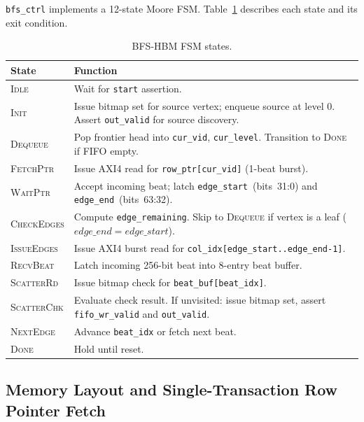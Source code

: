 \texttt{bfs\_ctrl} implements a 12-state Moore FSM. Table~\ref{tab:states} describes
each state and its exit condition.

\begin{table}[h]
\centering
\caption{BFS-HBM FSM states.}
\label{tab:states}
\small
\begin{tabular}{@{}lp{5.2cm}@{}}
\toprule
State & Function \\
\midrule
\textsc{Idle}       & Wait for \texttt{start} assertion. \\
\textsc{Init}       & Issue bitmap set for source vertex; enqueue source at level 0.
                       Assert \texttt{out\_valid} for source discovery. \\
\textsc{Dequeue}    & Pop frontier head into \texttt{cur\_vid}, \texttt{cur\_level}.
                       Transition to \textsc{Done} if FIFO empty. \\
\textsc{FetchPtr}   & Issue AXI4 read for \texttt{row\_ptr[cur\_vid]} (1-beat burst). \\
\textsc{WaitPtr}    & Accept incoming beat; latch \texttt{edge\_start}~(bits~31:0)
                       and \texttt{edge\_end}~(bits~63:32). \\
\textsc{CheckEdges} & Compute \texttt{edge\_remaining}. Skip to \textsc{Dequeue}
                       if vertex is a leaf ($\mathit{edge\_end} = \mathit{edge\_start}$). \\
\textsc{IssueEdges} & Issue AXI4 burst read for
                       \texttt{col\_idx[edge\_start..edge\_end-1]}. \\
\textsc{RecvBeat}   & Latch incoming 256-bit beat into 8-entry beat buffer. \\
\textsc{ScatterRd}  & Issue bitmap check for \texttt{beat\_buf[beat\_idx]}. \\
\textsc{ScatterChk} & Evaluate check result.
                       If unvisited: issue bitmap set, assert \texttt{fifo\_wr\_valid}
                       and \texttt{out\_valid}. \\
\textsc{NextEdge}   & Advance \texttt{beat\_idx} or fetch next beat. \\
\textsc{Done}       & Hold until reset. \\
\bottomrule
\end{tabular}
\end{table}

\subsection{Memory Layout and Single-Transaction Row Pointer Fetch}


